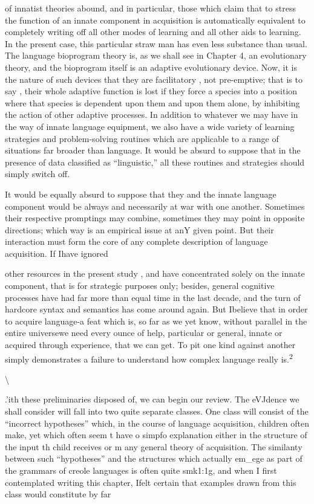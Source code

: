 
of innatist theories abound, and in particular, those which claim that to stress the function of an innate component in acquisition is auto\-matically equivalent to completely writing off all other modes of learning and all other aids to learning. In the present case, this par\-ticular straw man has even less substance than usual. The language bioprogram theory is, as we shall see in Chapter 4, an evolutionary theory, and the bioprogram itself is an adaptive evolutionary device. Now, it is the nature of such devices that they are facilitatory , not pre-emptive; that is to say , their whole adaptive function is lost if they force a species into a position where that species is dependent upon them and upon them alone, by inhibiting the action of other adaptive processes. In addition to whatever we may have in the way of innate language equipment, we also have a wide variety of learning strategies and problem-solving routines which are applicable to a range of situations far broader than language. It would be absurd to suppose that in the presence of data classified as ``linguistic,'' all these routines and strategies should simply switch off.

It would be equally absurd to suppose that they and the innate language component would be always and necessarily at war with one another. Sometimes their respective promptings may combine, some\-times they may point in opposite directions; which way is an empirical issue at anY given point. But their interaction must form the core of any complete description of language acquisition. If Ihave ignored

other resources in the present study , and have concentrated solely on the innate component, that is for strategic purposes only; besides, general cognitive processes have had far more than equal time in the last decade, and the turn of hardcore syntax and semantics has come around again. But Ibelieve that in order to acquire language-a feat which is, so far as we yet know, without parallel in the entire universe\-we need every ounce of help, particular or general, innate or acquired through experience, that we can get. To pit one kind against another simply demonstrates a failure to understand how complex language really is.\textsuperscript{2}

{\textbackslash}


{\textquotedbl}.{\textquotedbl}'ith these preliminaries disposed of, we can begin our review. The eVJdence we shall consider will fall into two quite separate classes. One class will consist of the ``incorrect hypotheses'' which, in the course of language acquisition, children often make, yet which often seem t have o simpfo explanation either in the structure of the input th child receives or m any general theory of acquisition. The simi\-lanty between such ``hypotheses'' and the structures which actually em\_ege as part of the grammars of creole languages is often quite smk1:1g, and when I first contemplated writing this chapter, Ifelt certain that examples drawn from this class would constitute by far

